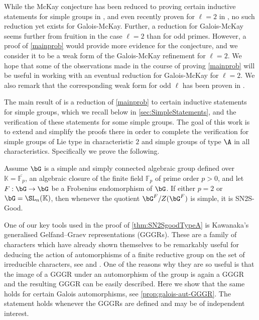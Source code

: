 \documentclass[eqthmnum, nocolour]{jt-calcs}
\begin{document}
\begin{pa}
While the McKay conjecture has been reduced to proving certain inductive statements for simple groups in \cite{imn:2007:reduction-mckay}, and even recently proven for $\ell=2$ in \cite{malle-spath:2015:mckay2}, no such reduction yet exists for Galois-McKay.  Further, a reduction for Galois-McKay seems further from fruition in the case $\ell=2$ than for odd primes.  However, a proof of \cref{mainprob} would provide more evidence for the conjecture, and we consider it to be a weak form of the Galois-McKay refinement for $\ell=2$.  We hope that some of the observations made in the course of proving \cref{mainprob} will be useful in working with an eventual reduction for Galois-McKay for $\ell=2$.  We also remark that the corresponding weak form for odd $\ell$ has been proven in  \cite{navarro-tiep-turull:2007:p-rational-characters}.
\end{pa}

\begin{pa}
The main result of \cite{schaeffer-fry:2015:odd-degree-characters} is a reduction of \cref{mainprob} to certain inductive statements for simple groups, which we recall below in \cref{sec:SimpleStatements}, and the verification of these statements for some simple groups. The goal of this work is to extend and simplify the proofs there in order to complete the verification for simple groups of Lie type in characteristic $2$ and simple groups of type $\A$ in all characteristics. Specifically we prove the following.
\end{pa}

\begin{maintheorem}\label{thm:SN2SgoodTypeA}
Assume $\bG$ is a simple and simply connected algebraic group defined over $\mathbb{K} = \overline{\mathbb{F}_p}$, an algebraic closure of the finite field $\mathbb{F}_p$ of prime order $p>0$, and let $F : \bG \to \bG$ be a Frobenius endomorphism of $\bG$. If either $p=2$ or $\bG = \SL_n(\mathbb{K})$, then whenever the quotient $\bG^F/Z(\bG^F)$ is simple, it is SN2S-Good.
\end{maintheorem}

\begin{pa}
One of our key tools used in the proof of \cref{thm:SN2SgoodTypeA} is Kawanaka's generalised Gelfand--Graev representations (GGGRs). These are a family of characters which have already shown themselves to be remarkably useful for deducing the action of automorphisms of a finite reductive group on the set of irreducible characters, see \cite{cabanes-spaeth:2015:equivariance-and-extendibility-in-groups-of-type-A} and \cite{taylor:2016:action-of-automorphisms-symplectic}. One of the reasons why they are so useful is that the image of a GGGR under an automorphism of the group is again a GGGR and the resulting GGGR can be easily described. Here we show that the same holds for certain Galois automorphisms, see \cref{prop:galois-aut-GGGR}. The statement holds whenever the GGGRs are defined and may be of independent interest.
\end{pa}
\end{document}

